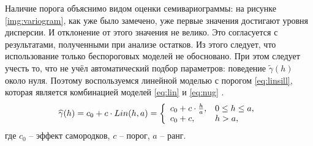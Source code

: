 Наличие порога объяснимо видом оценки семивариограммы: на рисунке \ref{img:variogram}, как уже было замечено, уже первые значения достигают уровня дисперсии. И отклонение от этого значения не велико. Это согласуется с результатами, полученными при анализе остатков. Из этого следует, что использование только беспороговых моделей не обосновано. При этом следует учесть то, что не учёл автоматический подбор параметров: поведение $ \tilde{\gamma}(h) $ около нуля. Поэтому воспользуемся линейной моделью с порогом \eqref{eq:linsill}, которая является комбинацией моделей \eqref{eq:lin} и \eqref{eq:nug} \cite{pebesma2001gstat}.
\begin{equation}
\label{eq:linsill}
	\widehat{\gamma}(h) = c_0 + c \cdot Lin(h, a) = \left\{
 \begin{array}{l l}
   c_0 + c \cdot \frac{h}{a}, & 0 \leq h \leq a, \\
   c_0 + c, & h > a,
 \end{array} \right.
\end{equation}
где $ c_0 $ -- эффект самородков, $ c $ -- порог, $ a $ -- ранг.

